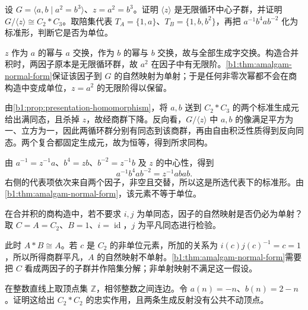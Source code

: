 \begin{exercise}\label{b1:ex:C-amalgam-central-quotient}
	设 \(G=\langle a,b\mid a^2=b^3\rangle\)、\(z=a^2=b^3\)。证明 \(\langle z\rangle\) 是无限循环中心子群，并证明 \(G/\langle z\rangle\cong C_2*C_3\)。取陪集代表 \(T_A=\{1,a\}\)、\(T_B=\{1,b,b^2\}\)，再把 \(a^{-1}b^4ab^{-2}\) 化为标准形，判断它是否为单位。
\end{exercise}

\begin{solution}
	\(z\) 作为 \(a\) 的幂与 \(a\) 交换，作为 \(b\) 的幂与 \(b\) 交换，故与全部生成字交换。构造合并积时，两因子原本是无限循环群，故 \(a^2\) 在因子中有无限阶。\cref{b1:thm:amalgam-normal-form}保证该因子到 \(G\) 的自然映射为单射；于是任何非零次幂都不会在商构造中变成单位，\(z=a^2\) 的无限阶得以保留。

	由\cref{b1:prop:presentation-homomorphism}，将 \(a,b\) 送到 \(C_2*C_3\) 的两个标准生成元给出满同态，且杀掉 \(z\)，故经商群下降。反向看，\(G/\langle z\rangle\) 中 \(a,b\) 的像满足平方为一、立方为一，因此两循环群分别有同态到该商群，再由自由积泛性质得到反向同态。两个复合都固定生成元，故为恒等，得到所求同构。

	由 \(a^{-1}=z^{-1}a\)、\(b^4=zb\)、\(b^{-2}=z^{-1}b\) 及 \(z\) 的中心性，得到
	\[
		a^{-1}b^4ab^{-2}=z^{-1}abab.
	\]
	右侧的代表项依次来自两个因子，非空且交替，所以这是所选代表下的标准形。由\cref{b1:thm:amalgam-normal-form}，该元素不等于单位。
\end{solution}

\begin{exercise}\label{b1:ex:C-amalgam-injective-input}
	在合并积的商构造中，若不要求 \(i,j\) 为单同态，因子的自然映射是否仍必为单射？取 \(C=A=C_2\)、\(B=1\)、\(i=\operatorname{id}\)，\(j\) 为平凡同态进行检验。
\end{exercise}

\begin{solution}
	此时 \(A*B\cong A\)。若 \(c\) 是 \(C_2\) 的非单位元素，所加的关系为 \(i(c)j(c)^{-1}=c=1\)，所以所得商群平凡，\(A\) 的自然映射不单射。\cref{b1:thm:amalgam-normal-form}需要把 \(C\) 看成两因子的子群并作陪集分解；非单射映射不满足这一假设。
\end{solution}

\begin{exercise}\label{b1:ex:C-dihedral-tree}
	在整数直线上取顶点集 \(\mathbb Z\)，相邻整数之间连边。令 \(a(n)=-n\)、\(b(n)=2-n\)。证明这给出 \(C_2*C_2\) 的忠实作用，且两条生成反射没有公共不动顶点。
\end{exercise}


